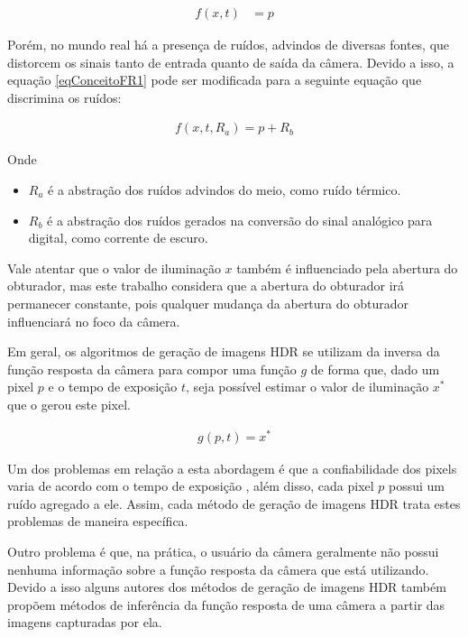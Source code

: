 	
\begin{align} \label{eqConceitoFR1}
          f(x,t) &= p
\end{align}

	Porém, no mundo real há a presença de ruídos, advindos de diversas fontes, que distorcem os sinais tanto de entrada quanto de saída da câmera. Devido a isso, a equação \ref{eqConceitoFR1} pode ser modificada para a seguinte equação que discrimina os ruídos:

\begin{align} \label{eqConceitoFR2}
						f (x, t, R_a) = p + R_b
\end{align}

Onde
\begin{itemize}
	\item $R_a$ é a abstração dos ruídos advindos do meio, como ruído térmico.
	\item $R_b$ é a abstração dos ruídos gerados na conversão do sinal analógico para digital, como corrente de escuro.
\end{itemize} 
		
	Vale atentar que o valor de iluminação $x$ também é influenciado pela abertura do obturador, mas este trabalho considera que a abertura do obturador irá permanecer constante, pois qualquer mudança da abertura do obturador influenciará no foco da câmera. 
	
	Em geral, os algoritmos de geração de imagens HDR se utilizam da inversa da função resposta da câmera para compor uma função $g$ de forma que, dado um pixel $p$ e o tempo de exposição $t$, seja possível estimar o valor de iluminação $x^*$ que o gerou este pixel.

\begin{align} \label{eqConceitoFR3}
	g(p, t) = x^*
\end{align}
	
	Um dos problemas em relação a esta abordagem é que a confiabilidade dos pixels varia de acordo com o tempo de exposição \cite{robertson}, além disso, cada pixel $p$ possui um ruído agregado a ele. Assim, cada método de geração de imagens HDR trata estes problemas de maneira específica.
	
	Outro problema é que, na prática, o usuário da câmera geralmente não possui nenhuma informação sobre a função resposta da câmera que está utilizando. Devido a isso alguns autores dos métodos de geração de imagens HDR também propõem métodos de inferência da função resposta de uma câmera a partir das imagens capturadas por ela.

